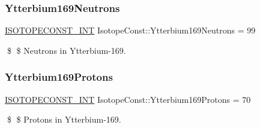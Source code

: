 \subsubsection{\texorpdfstring{Ytterbium169\+Neutrons}{Ytterbium169Neutrons}}
{\footnotesize\ttfamily \mbox{\hyperlink{group___isotope_const-_macros_ga5f18360b3e99483a35c32d789e62621c}{I\+S\+O\+T\+O\+P\+E\+C\+O\+N\+S\+T\+\_\+\+I\+NT}} Isotope\+Const\+::\+Ytterbium169\+Neutrons = 99}

\$ \$ Neutrons in Ytterbium-\/169. \mbox{\label{group___isotope_const-_ytterbium-_yb169_ga421bb03f4de55b9067b25f67591bdd4f}} 
\subsubsection{\texorpdfstring{Ytterbium169\+Protons}{Ytterbium169Protons}}
{\footnotesize\ttfamily \mbox{\hyperlink{group___isotope_const-_macros_ga5f18360b3e99483a35c32d789e62621c}{I\+S\+O\+T\+O\+P\+E\+C\+O\+N\+S\+T\+\_\+\+I\+NT}} Isotope\+Const\+::\+Ytterbium169\+Protons = 70}

\$ \$ Protons in Ytterbium-\/169. 